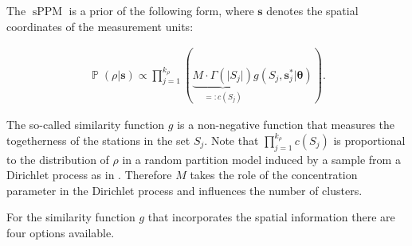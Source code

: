 \documentclass[12pt,a4paper]{article}
\DeclareMathOperator{\sPPM}{\mathrm{sPPM}}
\DeclareMathOperator{\PP}{\mathbb{P}}
\begin{document}
The $\sPPM$ is a prior of the following form, where $\mathbf{s}$ denotes the spatial coordinates of the measurement units:

\begin{align} \label{sPPM-prior}
    \PP(\rho | \pmb{s} ) \propto \prod_{j=1}^{k_{\rho}} \left( \underbrace{M \cdot \Gamma(\vert S_j \vert) }_{=:c(S_j)}g(S_j, \pmb{s}^*_j \vert \pmb{\theta}) \right) .
\end{align}

The so-called similarity function $g$ is a non-negative function that measures the togetherness of the stations in the set $S_j$.
Note that $\prod_{j=1}^{k_{\rho}} c(S_j) $ is proportional to the distribution of $\rho$ in a random partition model induced by a sample from a Dirichlet process as in \cite[Section 8.1.3]{lecturenotes}. Therefore $M$ takes the role of the concentration parameter in the Dirichlet process and influences the number of clusters.\medskip

For the similarity function $g$ that incorporates the spatial information there are four options available. \medskip
\end{document}
